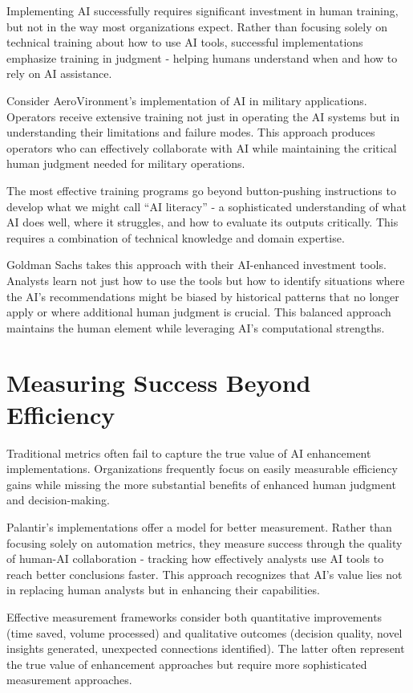 \documentclass[
  Letterpaper,
]{scrbook}
\begin{document}
Implementing AI successfully requires significant investment in human
training, but not in the way most organizations expect. Rather than
focusing solely on technical training about how to use AI tools,
successful implementations emphasize training in judgment - helping
humans understand when and how to rely on AI assistance.

Consider AeroVironment's implementation of AI in military applications.
Operators receive extensive training not just in operating the AI
systems but in understanding their limitations and failure modes. This
approach produces operators who can effectively collaborate with AI
while maintaining the critical human judgment needed for military
operations.

The most effective training programs go beyond button-pushing
instructions to develop what we might call ``AI literacy'' - a
sophisticated understanding of what AI does well, where it struggles,
and how to evaluate its outputs critically. This requires a combination
of technical knowledge and domain expertise.

Goldman Sachs takes this approach with their AI-enhanced investment
tools. Analysts learn not just how to use the tools but how to identify
situations where the AI's recommendations might be biased by historical
patterns that no longer apply or where additional human judgment is
crucial. This balanced approach maintains the human element while
leveraging AI's computational strengths.

\section{Measuring Success Beyond
Efficiency}\label{measuring-success-beyond-efficiency}

Traditional metrics often fail to capture the true value of AI
enhancement implementations. Organizations frequently focus on easily
measurable efficiency gains while missing the more substantial benefits
of enhanced human judgment and decision-making.

Palantir's implementations offer a model for better measurement. Rather
than focusing solely on automation metrics, they measure success through
the quality of human-AI collaboration - tracking how effectively
analysts use AI tools to reach better conclusions faster. This approach
recognizes that AI's value lies not in replacing human analysts but in
enhancing their capabilities.

Effective measurement frameworks consider both quantitative improvements
(time saved, volume processed) and qualitative outcomes (decision
quality, novel insights generated, unexpected connections identified).
The latter often represent the true value of enhancement approaches but
require more sophisticated measurement approaches.
\end{document}
